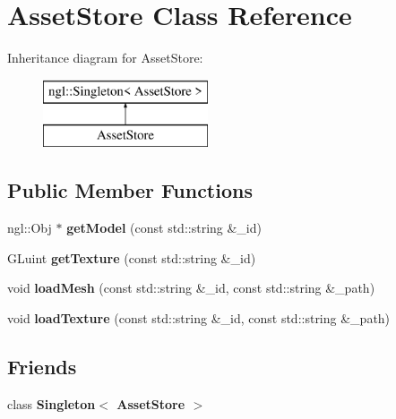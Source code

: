 \hypertarget{class_asset_store}{}\section{Asset\+Store Class Reference}
\label{class_asset_store}
Inheritance diagram for Asset\+Store\+:\begin{figure}[H]
\begin{center}
\leavevmode
\includegraphics[height=2.000000cm]{class_asset_store}
\end{center}
\end{figure}
\subsection*{Public Member Functions}
\begin{DoxyCompactItemize}
\item 
\hypertarget{class_asset_store_af72b7851872f56411f5045c1857dab24}{}ngl\+::\+Obj $\ast$ {\bfseries get\+Model} (const std\+::string \&\+\_\+id)\label{class_asset_store_af72b7851872f56411f5045c1857dab24}

\item 
\hypertarget{class_asset_store_ad012ce9c5f618e54ec2e00880af78069}{}G\+Luint {\bfseries get\+Texture} (const std\+::string \&\+\_\+id)\label{class_asset_store_ad012ce9c5f618e54ec2e00880af78069}

\item 
\hypertarget{class_asset_store_a42a8f8c68537da2eba47523e62517c67}{}void {\bfseries load\+Mesh} (const std\+::string \&\+\_\+id, const std\+::string \&\+\_\+path)\label{class_asset_store_a42a8f8c68537da2eba47523e62517c67}

\item 
\hypertarget{class_asset_store_ab821efdabc69e2a94d1ec9b5daa0a18a}{}void {\bfseries load\+Texture} (const std\+::string \&\+\_\+id, const std\+::string \&\+\_\+path)\label{class_asset_store_ab821efdabc69e2a94d1ec9b5daa0a18a}

\end{DoxyCompactItemize}
\subsection*{Friends}
\begin{DoxyCompactItemize}
\item 
\hypertarget{class_asset_store_a821306e4b80dce2b76d8a4c58a72313c}{}class {\bfseries Singleton$<$ Asset\+Store $>$}\label{class_asset_store_a821306e4b80dce2b76d8a4c58a72313c}

\end{DoxyCompactItemize}


